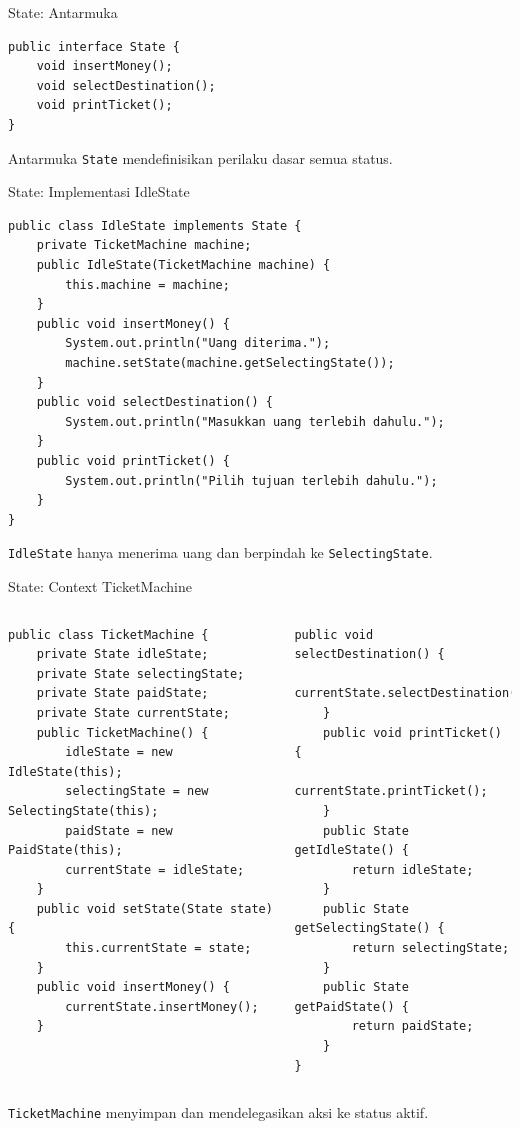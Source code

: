 \documentclass[aspectratio=169, table]{beamer}
\begin{document}
\begin{frame}[fragile]{State: Antarmuka}

\vspace{8pt}
\begin{lstlisting}[style=JavaStyle]
public interface State {
	void insertMoney();
	void selectDestination();
	void printTicket();
}
\end{lstlisting}

\small Antarmuka \texttt{State} mendefinisikan perilaku dasar semua status.
\end{frame}

\begin{frame}[fragile]{State: Implementasi IdleState}
	\vspace{20pt}
\begin{lstlisting}[style=JavaStyle]
public class IdleState implements State {
	private TicketMachine machine;
	public IdleState(TicketMachine machine) {
		this.machine = machine;
	}
	public void insertMoney() {
		System.out.println("Uang diterima.");
		machine.setState(machine.getSelectingState());
	}
	public void selectDestination() {
		System.out.println("Masukkan uang terlebih dahulu.");
	}
	public void printTicket() {
		System.out.println("Pilih tujuan terlebih dahulu.");
	}
}
\end{lstlisting}

\small \texttt{IdleState} hanya menerima uang dan berpindah ke \texttt{SelectingState}.
\end{frame}

\begin{frame}[fragile]{State: Context TicketMachine}
	\vspace{10pt}
\begin{columns}[T]
\begin{lstlisting}[style=JavaStyle]
public class TicketMachine {
	private State idleState;
	private State selectingState;
	private State paidState;
	private State currentState;
	public TicketMachine() {
		idleState = new IdleState(this);
		selectingState = new SelectingState(this);
		paidState = new PaidState(this);
		currentState = idleState;
	}
	public void setState(State state) {
		this.currentState = state;
	}
	public void insertMoney() {
		currentState.insertMoney();
	}
\end{lstlisting}

\begin{lstlisting}[style=JavaStyle]
	public void selectDestination() {
		currentState.selectDestination();
	}
	public void printTicket() {
		currentState.printTicket();
	}
	public State getIdleState() {
		return idleState;
	}
	public State getSelectingState() {
		return selectingState;
	}
	public State getPaidState() {
		return paidState;
	}
}
\end{lstlisting}
\end{columns}
\small \texttt{TicketMachine} menyimpan dan mendelegasikan aksi ke status aktif.
\end{frame}
\end{document}
